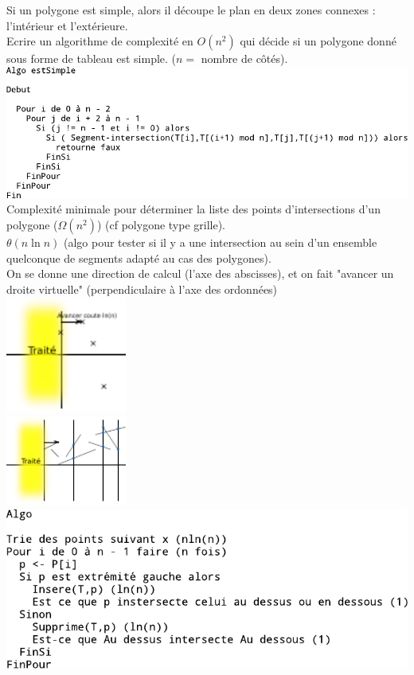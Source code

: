  Si un polygone est simple, alors il découpe le plan en deux zones connexes : l'intérieur et l'extérieure.\\

 Ecrire un algorithme de complexité en $O(n^2)$ qui décide si un polygone donné sous forme de tableau est simple. ($n=$ nombre de côtés).\\
\includegraphics{Images/fig8.pdf}\\

 Complexité minimale pour déterminer la liste des points d'intersections d'un polygone ($\Omega (n^2)$) (cf polygone type grille). \\

 $\theta(n\ln n)$ (algo pour tester si il y a une intersection au sein d'un ensemble quelconque de segments adapté au cas des polygones). \\

 On se donne une direction de calcul (l'axe des abscisses), et on fait "avancer un droite virtuelle" (perpendiculaire à l'axe des ordonnées) \\
\includegraphics[width=150px]{Images/fig9.pdf} \\
\includegraphics[width=150px]{Images/fig10.pdf} \\
\includegraphics{Images/fig11.pdf} \\

